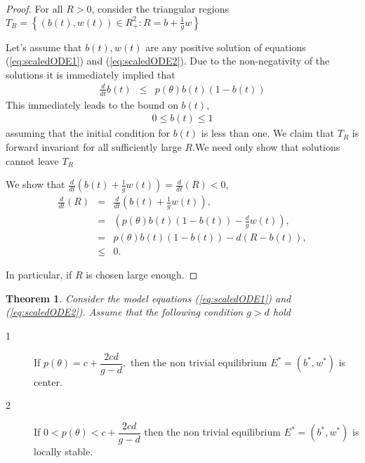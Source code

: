 \documentclass[review]{elsarticle}
\newtheorem{theorem}{Theorem}[section]
\begin{document}
\begin{proof}
For all $R>0$, consider the triangular regions $T_{R}=\left\{ \left(
b(t),w(t)\right) \in R_{+}^{2}:R=b+\frac{1}{g}w\right\} $

Let's assume that $b(t),w(t)$ are any positive solution of equations
(\ref{eq:scaledODE1}) and (\ref{eq:scaledODE2}). Due to the
non-negativity of the solutions it is immediately implied that
\begin{eqnarray}
  \frac{d}{dt}b(t) & \leq & p\left( \theta \right) b(t)\left( 1-b(t)\right) 
\end{eqnarray}
This immediately leads to the bound on $b(t)$,
\begin{eqnarray}
  0\leq b(t)\leq 1
\end{eqnarray}
assuming that the initial condition for $b(t)$ is less than one.  We
claim that $T_{R}$ is forward invariant for all sufficiently large
$R.$We need only show that solutions cannot leave $T_{R}$

We show that
$\frac{d}{dt}\left( b(t)+\frac{1}{g}w(t)\right) =\frac{d}{dt}%
\left( R\right) <0$,
\begin{eqnarray}
  \frac{d}{dt}\left( R\right) & = & \frac{d}{dt}\left( b(t)+\frac{1}{g}w(t)\right), \\
                              & = & \left( p\left( \theta \right) b(t)
                                    \left( 1-b(t)\right) -
                                     \frac{d}{g}w\left( t\right) \right), \\
                              & = & p\left( \theta \right) b(t)\left(1-b(t)\right) -
                                    d\left( R-b(t)\right), \\
                              & \leq & 0.
\end{eqnarray}


In particular, if $R$ is chosen large enough.
\end{proof}
\begin{theorem}
   Consider the model equations (\ref{eq:scaledODE1}) and
  (\ref{eq:scaledODE2}). Assume that the following condition $g>d$
  hold
\end{theorem}

\begin{description}
\item[1]  If $%
p(\theta )=c+\dfrac{2cd}{g-d},$ then the non trivial equilibrium $%
E^{\ast }=(b^{\ast },w^{\ast })$ is center.

\item[2] If $0<p(\theta )<c+\dfrac{2cd}{g-d}$ then the non trivial
equilibrium $E^{\ast }=(b^{\ast },w^{\ast })$ is locally stable.
\end{description}
\end{document}
